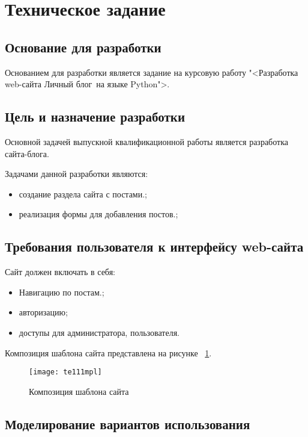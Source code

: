 \section{Техническое задание}
\subsection{Основание для разработки}

Основанием для разработки является задание на курсовую работу "<Разработка web-сайта \textquotedbl Личный блог\textquotedbl\ на языке Python">.

\subsection{Цель и назначение разработки}

Основной задачей выпускной квалификационной работы является 
разработка сайта-блога.

Задачами данной разработки являются:
\begin{itemize}
\item создание раздела сайта с постами.;
\item реализация формы для добавления постов.;
\end{itemize}

\subsection{Требования пользователя к интерфейсу web-сайта}

Сайт должен включать в себя:
\begin{itemize}
    \item Навигацию по постам.;
    \item авторизацию;
    \item доступы для администратора, пользователя.
\end{itemize}

Композиция шаблона сайта представлена на рисунке ~\ref{te111mpl:image}.

\begin{figure}[ht]
\texttt{[image: te111mpl]}
\caption{Композиция шаблона сайта}
\label{te111mpl:image}
\end{figure}

\subsection{Моделирование вариантов использования}

